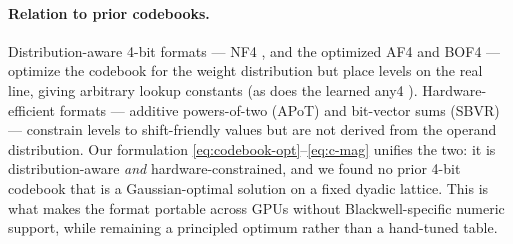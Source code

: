 \paragraph{Relation to prior codebooks.} Distribution-aware 4-bit formats --- NF4
\cite{dettmers2023qlora}, and the optimized AF4 \cite{yoshida2023af4} and BOF4
\cite{blumenberg2026bof4} --- optimize the codebook for the weight distribution
but place levels on the real line, giving arbitrary lookup constants (as does the
learned any4 \cite{elhoushi2025any4}). Hardware-efficient formats --- additive
powers-of-two (APoT) \cite{li2020apot} and bit-vector sums (SBVR)
\cite{bang2025sbvr} --- constrain levels to shift-friendly values but are not
derived from the operand distribution. Our formulation
\eqref{eq:codebook-opt}--\eqref{eq:c-mag} unifies the two: it is
distribution-aware \emph{and} hardware-constrained, and we found no prior 4-bit
codebook that is a Gaussian-optimal solution on a fixed dyadic lattice. This is
what makes the format portable across GPUs without Blackwell-specific numeric
support, while remaining a principled optimum rather than a hand-tuned table.
